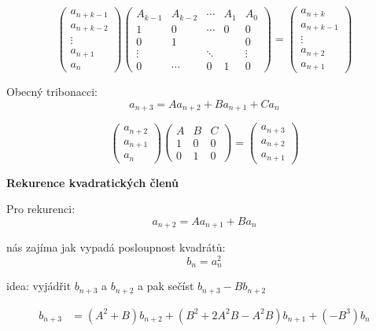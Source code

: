 \documentclass[11pt]{article}
\begin{document}
\[
 \begin{pmatrix}
    a_{n+k-1} \\
    a_{n+k-2} \\
    \vdots    \\
    a_{n+1} \\
    a_{n}
 \end{pmatrix}
 \begin{pmatrix}
  A_{k-1} & A_{k-2} & \cdots & A_{1} & A_{0} \\
  1 & 0 &  \cdots & 0 & 0 \\
  0  & 1  &  &  & 0 \\
  \vdots &  & \ddots &  & \vdots \\
  0 & \cdots & 0 & 1 & 0
 \end{pmatrix}
 =
 \begin{pmatrix}
    a_{n+k}   \\
    a_{n+k-1} \\
    \vdots    \\
    a_{n+2}  \\
    a_{n+1}
 \end{pmatrix}
\]

Obecný tribonacci: \[ a_{n+3} = A a_{n+2} + B a_{n+1} + C a_{n}\]

\[
 \begin{pmatrix}
    a_{n+2} \\
    a_{n+1} \\
    a_{n}
 \end{pmatrix}
 \begin{pmatrix}
  A & B & C \\
  1 & 0 & 0 \\
  0 & 1 & 0
 \end{pmatrix}
 =
 \begin{pmatrix}
    a_{n+3} \\
    a_{n+2} \\
    a_{n+1}
 \end{pmatrix}
\]

\textbf{Rekurence kvadratických členů}

Pro rekurenci:
\[ a_{n+2}=A a_{n+1} + B a_{n} \]

nás zajíma jak vypadá posloupnost kvadrátů:
\[ b_{n} = a_{n}^2 \]

idea: vyjádřit $b_{n+3}$ a $b_{n+2}$ a pak sečíst $b_{n+3}-Bb_{n+2}$


\begin{align*}
    b_{n+3} &= (A^2+B)b_{n+2} + (B^2 + 2A^2B - A^2B)b_{n+1} +(-B^3)b_{n}
\end{align*}
\end{document}
